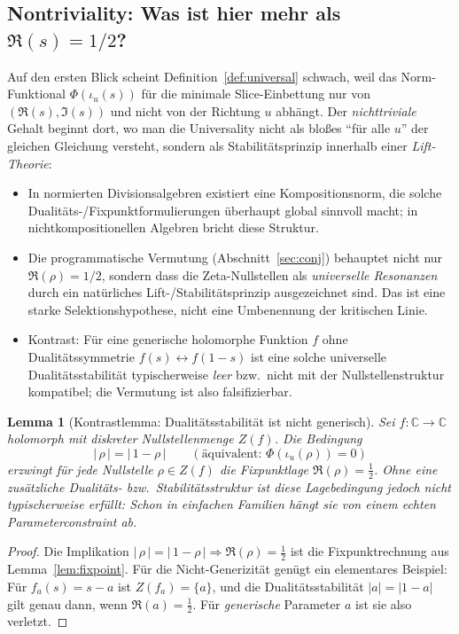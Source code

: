 \documentclass[11pt,a4paper]{article}
\theoremstyle{plain}
\newtheorem{lemma}{Lemma}
\theoremstyle{definition}
\theoremstyle{remark}
\newcommand{\C}{\mathbb{C}}
\begin{document}
\subsection*{Nontriviality: Was ist hier mehr als $\Re(s)=1/2$?}
Auf den ersten Blick scheint Definition~\ref{def:universal} schwach, weil das Norm-Funktional $\Phi(\iota_u(s))$
für die minimale Slice-Einbettung nur von $(\Re(s),\Im(s))$ und nicht von der Richtung $u$ abhängt.
Der \emph{nichttriviale} Gehalt beginnt dort, wo man die Universality nicht als bloßes
``für alle $u$'' der gleichen Gleichung versteht, sondern als Stabilitätsprinzip innerhalb einer
\emph{Lift-Theorie}:
\begin{itemize}
\item In normierten Divisionsalgebren existiert eine Kompositionsnorm, die solche Dualitäts-/Fixpunktformulierungen
      überhaupt global sinnvoll macht; in nichtkompositionellen Algebren bricht diese Struktur.
\item Die programmatische Vermutung (Abschnitt~\ref{sec:conj}) behauptet nicht nur $\Re(\rho)=1/2$,
      sondern dass die Zeta-Nullstellen als \emph{universelle Resonanzen} durch ein natürliches Lift-/Stabilitätsprinzip
      ausgezeichnet sind. Das ist eine starke Selektionshypothese, nicht eine Umbenennung der kritischen Linie.
\item Kontrast: Für eine generische holomorphe Funktion $f$ ohne Dualitätssymmetrie $f(s)\leftrightarrow f(1-s)$
      ist eine solche universelle Dualitätsstabilität typischerweise \emph{leer} bzw.\ nicht mit der Nullstellenstruktur
      kompatibel; die Vermutung ist also falsifizierbar.
\end{itemize}

\begin{lemma}[Kontrastlemma: Dualitätsstabilität ist nicht generisch]\label{lem:contrast}
Sei $f:\C\to\C$ holomorph mit diskreter Nullstellenmenge $Z(f)$.
Die Bedingung
\[
|\,\rho\,|=|\,1-\rho\,|\qquad(\text{äquivalent: }\Phi(\iota_u(\rho))=0)
\]
erzwingt für jede Nullstelle $\rho\in Z(f)$ die Fixpunktlage $\Re(\rho)=\tfrac12$.
Ohne eine zusätzliche Dualitäts- bzw.\ Stabilitätsstruktur ist diese Lagebedingung jedoch
\emph{nicht} typischerweise erfüllt: Schon in einfachen Familien hängt sie von einem
echten Parameterconstraint ab.
\end{lemma}

\begin{proof}
Die Implikation $|\,\rho\,|=|\,1-\rho\,|\Rightarrow \Re(\rho)=\tfrac12$ ist die Fixpunktrechnung aus
Lemma~\ref{lem:fixpoint}. Für die Nicht-Generizität genügt ein elementares Beispiel:
Für $f_a(s)=s-a$ ist $Z(f_a)=\{a\}$, und die Dualitätsstabilität $|a|=|1-a|$ gilt genau dann,
wenn $\Re(a)=\tfrac12$. Für \emph{generische} Parameter $a$ ist sie also verletzt.
\end{proof}
\end{document}
